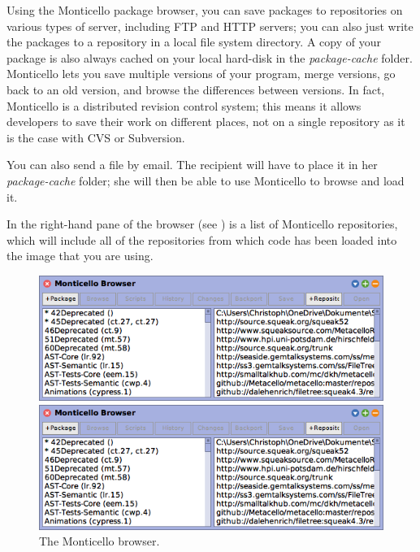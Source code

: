 \documentclass[a4paper,10pt,twoside]{book}
\begin{document}
Using the Monticello package browser, you can save packages to repositories on various types of server, including FTP and HTTP servers; you can also just write the packages to a repository in a local file system directory.
A copy of your package is also always cached on your local hard-disk in the \emph{package-cache} folder. 
Monticello lets you save multiple versions of your program, merge versions, go back to an old version, and browse the differences between versions. 
In fact, Monticello is a distributed revision control system; this means it allows developers to save their work on different places, not on a single repository as it is the case with CVS or Subversion.

You can also send a  file by email. 
The recipient will have to place it in her \emph{package-cache} folder; she will then be able to use Monticello to browse and load it. 

In the right-hand pane of the browser (see ) is a list of Monticello repositories, which will include all of the repositories from which code has been loaded into the image that you are using.  

\begin{figure}[hbt]
\ifluluelse
	{\centerline {\includegraphics[width=\textwidth]{MonticelloBrowser}}}
	{\centerline {\includegraphics[scale=0.7]{MonticelloBrowser}}}
\caption{The Monticello browser.
\label{fig:monticello1}}
\end{figure}
\end{document}
